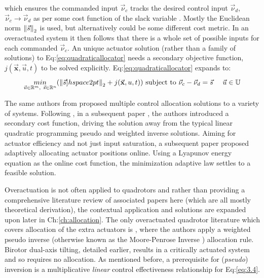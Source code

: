 which ensures the commanded input $\vec{\nu}_c$ tracks the desired control input $\vec{\nu}_d$,~$\vec{\nu}_c\rightarrow\vec{\nu}_d$ as per some cost function of the slack variable . Mostly the Euclidean norm $\left\lVert\vec{s}\right\rVert_2$ is used, but alternatively could be some different cost metric. In an overactuated system it then follows that there is a whole set of possible inputs for each commanded $\vec{\nu}_c$. An unique actuator solution (rather than a family of solutions) to Eq:\ref{eq:quadraticallocator} needs a secondary objective function, $j(\vec{\mathbf{x}},\vec{u},t)$ to be solved explicitly. Eq:\ref{eq:quadraticallocator} expands to:
\begin{equation} \label{eq:quadraticallocatorcost}
\underset{\vec{u} \in \mathbb{R}^m,~\vec{s} \in \mathbb{R}^n}{min}(\left\lVert\vec{s}]hspace{2pt}\right\rVert_2+j(\vec{\mathbf{x}},u,t)) ~\text{subject to} ~\vec{\nu}_c - \vec{\nu}_d=\vec{s}~~~~\vec{u} \in \mathbb{U}
\end{equation}
\par
The same authors from \cite{allocation,efficientallocation,adaptiveallocation} proposed multiple control allocation solutions to a variety of systems. Following \cite{allocation}, in a subsequent paper \cite{efficientallocation}, the authors introduced a secondary cost function, driving the solution away from the typical linear quadratic programming pseudo and weighted inverse solutions.  Aiming for actuator efficiency and not just input saturation, a subsequent paper \cite{adaptiveallocation} proposed adaptively allocating actuator positions online. Using a Lyapunov energy equation as the online cost function, the minimization adaptive law settles to a feasible solution.
\par
Overactuation is not often applied to quadrotors and rather than providing a comprehensive literature review of associated papers here (which are all mostly theoretical derivation), the contextual application and solutions are expanded upon later in Ch:\ref{ch:allocation}. The only overactuated quadrotor literature which covers allocation of the extra actuators is \cite{tiltgasco,tiltrihani}, where the authors apply a weighted pseudo inverse (otherwise known as the Moore-Penrose Inverse \cite{moorepenrose}) allocation rule. Birotor dual-axis tilting, detailed earlier, results in a critically actuated system and so requires no allocation. As mentioned before, a prerequisite for (\emph{pseudo}) inversion is a multiplicative \emph{linear} control effectiveness relationship for Eq:\ref{eq:3.4}. 
\par
